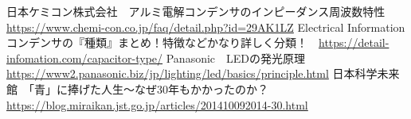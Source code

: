 
\begin{thebibliography}{99}
    \setcounter{num}{2}
    \bibitem{}日本ケミコン株式会社　アルミ電解コンデンサのインピーダンス周波数特性　\url{https://www.chemi-con.co.jp/faq/detail.php?id=29AK1LZ}
    \bibitem{}Electrical Information　コンデンサの『種類』まとめ！特徴などかなり詳しく分類！　\url{https://detail-infomation.com/capacitor-type/}
    \bibitem{}Panasonic　LEDの発光原理　\url{https://www2.panasonic.biz/jp/lighting/led/basics/principle.html}
    \bibitem{}日本科学未来館　「青」に捧げた人生～なぜ30年もかかったのか？　\url{https://blog.miraikan.jst.go.jp/articles/201410092014-30.html}
\end{thebibliography}